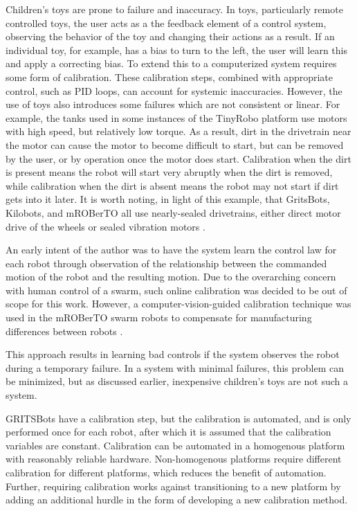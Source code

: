 Children's toys are prone to failure and inaccuracy.
In toys, particularly remote controlled toys, the user acts as a the feedback element of a control system, observing the behavior of the toy and changing their actions as a result. 
If an individual toy, for example, has a bias to turn to the left, the user will learn this and apply a correcting bias.
To extend this to a computerized system requires some form of calibration. 
These calibration steps, combined with appropriate control, such as PID loops, can account for systemic inaccuracies. 
However, the use of toys also introduces some failures which are not consistent or linear. 
For example, the tanks used in some instances of the TinyRobo platform use motors with high speed, but relatively low torque. 
As a result, dirt in the drivetrain near the motor can cause the motor to become difficult to start, but can be removed by the user, or by operation once the motor does start. 
Calibration when the dirt is present means the robot will start very abruptly when the dirt is removed, while calibration when the dirt is absent means the robot may not start if dirt gets into it later. 
It is worth noting, in light of this example, that GritsBots, Kilobots, and mROBerTO all use nearly-sealed drivetrains, either direct motor drive of the wheels or sealed vibration motors \citep{rubenstein2014kilobot, Kim2016mROBerTOAM, pickem2015gritsbot}. 

An early intent of the author was to have the system learn the control law for each robot through observation of the relationship between the commanded motion of the robot and the resulting motion. 
Due to the overarching concern with human control of a swarm, such online calibration was decided to be out of scope for this work. 
However, a computer-vision-guided calibration technique was used in the mROBerTO swarm robots to compensate for manufacturing differences between robots \citep{Kim2016mROBerTOAM}. 

This approach results in learning bad controls if the system observes the robot during a temporary failure. 
In a system with minimal failures, this problem can be minimized, but as discussed earlier, inexpensive children's toys are not such a system. 

GRITSBots have a calibration step, but the calibration is automated, and is only performed once for each robot, after which it is assumed that the calibration variables are constant.
Calibration can be automated in a homogenous platform with reasonably reliable hardware. 
Non-homogenous platforms require different calibration for different platforms, which reduces the benefit of automation. 
Further, requiring calibration works against transitioning to a new platform by adding an additional hurdle in the form of developing a new calibration method.

